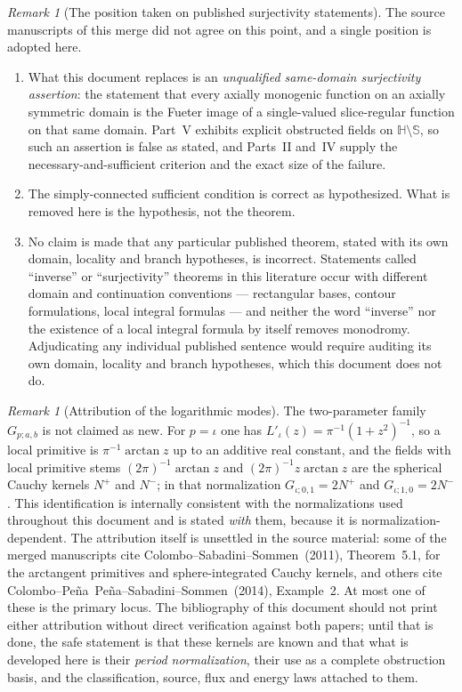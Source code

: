 \documentclass[11pt,a4paper]{article}
\numberwithin{equation}{section}
\theoremstyle{definition}
\theoremstyle{remark}
\newtheorem{remark}[theorem]{Remark}
\theoremstyle{plain}
\newcommand{\HH}{\mathbb H}
\newcommand{\SSS}{\mathbb S}
\begin{document}
\begin{remark}[The position taken on published surjectivity statements]
\label{f:rem:position}
The source manuscripts of this merge did not agree on this point, and a
single position is adopted here.
\begin{enumerate}[label=\textup{(\roman*)}]
\item What this document replaces is an \emph{unqualified same-domain
surjectivity assertion}: the statement that every axially monogenic
function on an axially symmetric domain is the Fueter image of a
single-valued slice-regular function on that same domain. Part~V exhibits
explicit obstructed fields on $\HH\setminus\SSS$, so such an assertion is
false as stated, and Parts~II and~IV supply the necessary-and-sufficient
criterion and the exact size of the failure.
\item The simply-connected sufficient condition is correct as hypothesized.
What is removed here is the hypothesis, not the theorem.
\item No claim is made that any particular published theorem, stated with
its own domain, locality and branch hypotheses, is incorrect. Statements
called ``inverse'' or ``surjectivity'' theorems in this literature occur
with different domain and continuation conventions --- rectangular bases,
contour formulations, local integral formulas --- and neither the word
``inverse'' nor the existence of a local integral formula by itself removes
monodromy. Adjudicating any individual published sentence would require
auditing its own domain, locality and branch hypotheses, which this
document does not do.
\end{enumerate}
\end{remark}

\begin{remark}[Attribution of the logarithmic modes]
\label{f:rem:attribution}
The two-parameter family $G_{p;a,b}$ is not claimed as new. For $p=\iota$
one has $L'_{\iota}(z)=\pi^{-1}(1+z^2)^{-1}$, so a local primitive is
$\pi^{-1}\arctan z$ up to an additive real constant, and the fields with
local primitive stems $(2\pi)^{-1}\arctan z$ and
$(2\pi)^{-1}z\arctan z$ are the spherical Cauchy kernels $N^+$ and $N^-$;
in that normalization $G_{\iota;0,1}=2N^+$ and $G_{\iota;1,0}=2N^-$. This
identification is internally consistent with the normalizations used
throughout this document and is stated \emph{with} them, because it is
normalization-dependent. The attribution itself is unsettled in the source
material: some of the merged manuscripts cite
Colombo--Sabadini--Sommen~(2011), Theorem~5.1, for the arctangent
primitives and sphere-integrated Cauchy kernels, and others cite
Colombo--Pe\~na~Pe\~na--Sabadini--Sommen~(2014), Example~2. At most one of
these is the primary locus. The bibliography of this document should not
print either attribution without direct verification against both papers;
until that is done, the safe statement is that these kernels are known and
that what is developed here is their \emph{period normalization}, their use
as a complete obstruction basis, and the classification, source, flux and
energy laws attached to them.
\end{remark}
\end{document}
